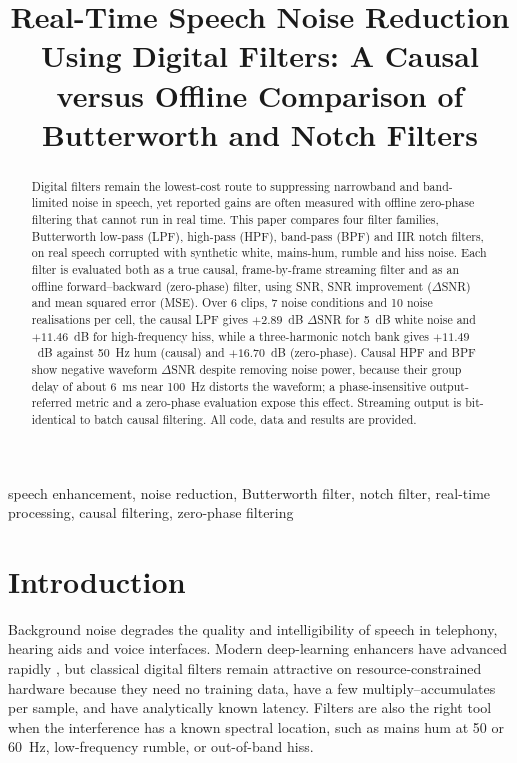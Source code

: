 \documentclass[conference]{IEEEtran}
\begin{document}
\title{Real-Time Speech Noise Reduction Using Digital Filters: A Causal versus Offline Comparison of Butterworth and Notch Filters}

\author{
}

\maketitle

\begin{abstract}
Digital filters remain the lowest-cost route to suppressing narrowband and band-limited noise in speech, yet reported gains are often measured with offline zero-phase filtering that cannot run in real time. This paper compares four filter families, Butterworth low-pass (LPF), high-pass (HPF), band-pass (BPF) and IIR notch filters, on real speech corrupted with synthetic white, mains-hum, rumble and hiss noise. Each filter is evaluated both as a true causal, frame-by-frame streaming filter and as an offline forward--backward (zero-phase) filter, using SNR, SNR improvement ($\Delta$SNR) and mean squared error (MSE). Over 6 clips, 7 noise conditions and 10 noise realisations per cell, the causal LPF gives $+2.89$~dB $\Delta$SNR for 5~dB white noise and $+11.46$~dB for high-frequency hiss, while a three-harmonic notch bank gives $+11.49$~dB against 50~Hz hum (causal) and $+16.70$~dB (zero-phase). Causal HPF and BPF show negative waveform $\Delta$SNR despite removing noise power, because their group delay of about 6~ms near 100~Hz distorts the waveform; a phase-insensitive output-referred metric and a zero-phase evaluation expose this effect. Streaming output is bit-identical to batch causal filtering. All code, data and results are provided.
\end{abstract}

\begin{IEEEkeywords}
speech enhancement, noise reduction, Butterworth filter, notch filter, real-time processing, causal filtering, zero-phase filtering
\end{IEEEkeywords}

\section{Introduction}
Background noise degrades the quality and intelligibility of speech in telephony, hearing aids and voice interfaces. Modern deep-learning enhancers have advanced rapidly \cite{wang2018supervised,das2021fundamentals,michelsanti2021overview}, but classical digital filters remain attractive on resource-constrained hardware because they need no training data, have a few multiply--accumulates per sample, and have analytically known latency. Filters are also the right tool when the interference has a known spectral location, such as mains hum at 50 or 60~Hz, low-frequency rumble, or out-of-band hiss.
\end{document}
